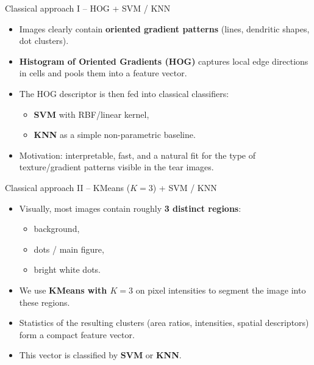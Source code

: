 \documentclass[aspectratio=169]{beamer}
\begin{document}
\begin{frame}{Classical approach I -- HOG + SVM / KNN}
    \begin{itemize}
        \item Images clearly contain \textbf{oriented gradient patterns} (lines, dendritic
              shapes, dot clusters).
        \item \textbf{Histogram of Oriented Gradients (HOG)} captures local edge
              directions in cells and pools them into a feature vector.
        \item The HOG descriptor is then fed into classical classifiers:
              \begin{itemize}
                  \item \textbf{SVM} with RBF/linear kernel,
                  \item \textbf{KNN} as a simple non-parametric baseline.
              \end{itemize}
        \item Motivation: interpretable, fast, and a natural fit for the type of
              texture/gradient patterns visible in the tear images.
    \end{itemize}
\end{frame}

\begin{frame}{Classical approach II -- KMeans ($K{=}3$) + SVM / KNN}
    \begin{itemize}
        \item Visually, most images contain roughly \textbf{3 distinct regions}:
              \begin{itemize}
                  \item background,
                  \item dots / main figure,
                  \item bright white dots.
              \end{itemize}
        \item We use \textbf{KMeans with $K{=}3$} on pixel intensities to segment
              the image into these regions.
        \item Statistics of the resulting clusters (area ratios, intensities,
              spatial descriptors) form a compact feature vector.
        \item This vector is classified by \textbf{SVM} or \textbf{KNN}.
    \end{itemize}
\end{frame}
\end{document}
